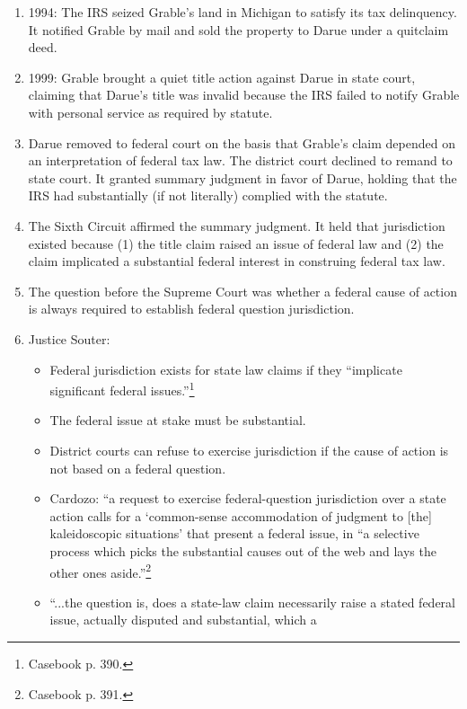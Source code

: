 \begin{enumerate}
    \item 1994: The IRS seized Grable's land in Michigan to satisfy its tax 
    delinquency. It notified Grable by mail and sold the property to Darue 
    under a quitclaim deed.
    \item 1999: Grable brought a quiet title action against Darue in state 
    court, claiming that Darue's title was invalid because the IRS failed to 
    notify Grable with personal service as required by statute.
    \item Darue removed to federal court on the basis that Grable's claim 
    depended on an interpretation of federal tax law. The district court 
    declined to remand to state court. It granted summary judgment in favor of 
    Darue, holding that the IRS had substantially (if not literally) complied 
    with the statute.
    \item The Sixth Circuit affirmed the summary judgment. It held that 
    jurisdiction existed because (1) the title claim raised an issue of 
    federal law and (2) the claim implicated a substantial federal interest in 
    construing federal tax law.
    \item The question before the Supreme Court was whether a federal cause of 
    action is always required to establish federal question jurisdiction.
    \item Justice Souter:
    \begin{itemize}
        \item Federal jurisdiction exists for state law claims if they 
        ``implicate significant federal issues.''\footnote{Casebook p. 390.}
        \item The federal issue at stake must be substantial.
        \item District courts can refuse to exercise jurisdiction if the cause 
        of action is not based on a federal question.
        \item Cardozo: ``a request to exercise federal-question jurisdiction 
        over a state action calls for a `common-sense accommodation of 
        judgment to [the] kaleidoscopic situations' that present a federal 
        issue, in ``a selective process which picks the substantial causes out 
        of the web and lays the other ones aside.''\footnote{Casebook p. 391.}
        \item ``...the question is, does a state-law claim necessarily raise a 
        stated federal issue, actually disputed and substantial, which a 

\end{itemize}
\end{enumerate}
